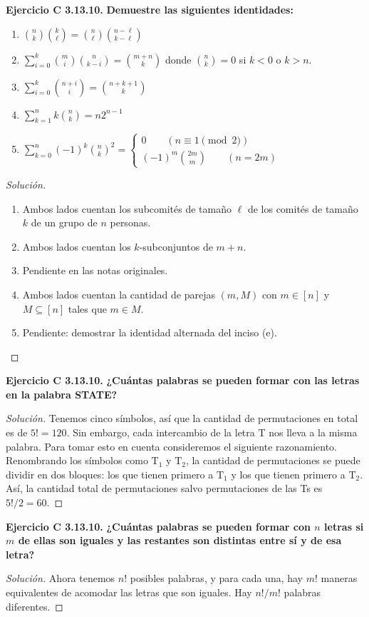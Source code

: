 \medskip\noindent\textbf{Ejercicio C
3.13.10.}  \textbf{Demuestre las siguientes
identidades:}
\begin{enumerate}
\item ${n \choose k}{k \choose\ell} = {n
\choose\ell}{n-\ell \choose k-\ell}$
\item $ \sum_{i = 0}^k{m \choose i}{n \choose
k-i} = {m + n \choose k}$ donde ${n \choose
k} = 0$ si $k<0$ o $k>n$.
\item $ \sum_{i = 0}^k{n + i \choose i} = {n
+ k + 1 \choose k}$
\item $\sum_{k=1}^nk{n\choose k}=n2^{n-1}$
\item $\sum_{k=0}^{n}(-1)^k{n\choose k}^2=
\begin{cases}
0\qquad(n\equiv1\pmod2)\\
(-1)^m{2m\choose m}\qquad(n=2m)
\end{cases}$
\end{enumerate}
\begin{proof}[Solución]\leavevmode
\begin{enumerate}
\item Ambos lados cuentan los subcomités de
tamaño $\ell$ de los comités de tamaño $k$ de
un grupo de $n$ personas.
\item Ambos lados cuentan los
$k$-subconjuntos de $m + n$.
\item Pendiente en las notas originales.
\item Ambos lados cuentan la cantidad de
parejas $(m,M)$ con $m\in[n]$ y $M\subseteq
[n]$ tales que $m\in M$.
\item Pendiente: demostrar la identidad
alternada del inciso (e).
\end{enumerate}
\end{proof}
\medskip\noindent\textbf{Ejercicio C
3.13.10.}  \textbf{¿Cuántas palabras se
pueden formar con las letras en la palabra
STATE?}
\begin{proof}[Solución]
Tenemos cinco símbolos, así que la cantidad
de permutaciones en total es de $5! = 120$.
Sin embargo, cada intercambio de la letra T
nos lleva a la misma palabra. Para tomar esto
en cuenta consideremos el siguiente
razonamiento. Renombrando los símbolos como
$\mathrm{T}_1$ y $\mathrm{T}_2$, la cantidad
de permutaciones se puede dividir en dos
bloques: los que tienen primero a
$\mathrm{T}_1$ y los que tienen primero a
$\mathrm{T}_2$. Así, la cantidad total de
permutaciones salvo permutaciones de las Ts
es $5!/2 = 60$.
\end{proof}
\medskip\noindent\textbf{Ejercicio C
3.13.10.}  \textbf{¿Cuántas palabras se
pueden formar con $n$ letras si $m$ de ellas
son iguales y las restantes son distintas
entre sí y de esa letra?}
\begin{proof}[Solución]
Ahora tenemos $n!$ posibles palabras, y para
cada una, hay $m!$ maneras equivalentes de
acomodar las letras que son iguales. Hay
$n!/m!$ palabras diferentes.
\end{proof}

